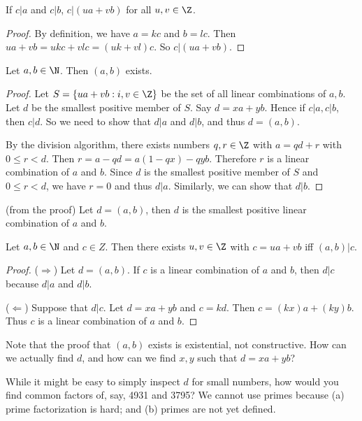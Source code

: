 \documentclass[a4paper]{article}
\begin{document}
\begin{prop}
  If $c|a$ and $c|b$, $c|(ua + vb)$ for all $u, v\in \Z$.
\end{prop}

\begin{proof}
  By definition, we have $a = kc$ and $b = lc$. Then $ua + vb = ukc + vlc = (uk + vl)c$. So $c|(ua + vb)$.
\end{proof}

\begin{thm}
  Let $a,b\in \N$. Then $(a, b)$ exists.
\end{thm}

\begin{proof}
  Let $S=\{ua + vb:i, v\in\Z\}$ be the set of all linear combinations of $a, b$. Let $d$ be the smallest positive member of $S$. Say $d = xa + yb$. Hence if $c|a, c|b$, then $c|d$. So we need to show that $d|a$ and $d|b$, and thus $d=(a, b)$.

  By the division algorithm, there exists numbers $q, r\in\Z$ with $a = qd + r$ with $0\leq r < d$. Then $r = a - qd = a(1 - qx) - qyb$. Therefore $r$ is a linear combination of $a$ and $b$. Since $d$ is the smallest positive member of $S$ and $0\leq r < d$, we have $r = 0$ and thus $d|a$. Similarly, we can show that $d|b$.
\end{proof}

\begin{cor}
  (from the proof) Let $d  = (a, b)$, then $d$ is the smallest positive linear combination of $a$ and $b$.
\end{cor}

\begin{cor}
  Let $a, b\in\N$ and $c\in Z$. Then there exists $u, v\in \Z$  with $c=ua + vb$ iff $(a, b)|c$.
\end{cor}

\begin{proof}
  ($\Rightarrow$) Let $d=(a, b)$. If $c$ is a linear combination of $a$ and $b$, then $d|c$ because $d|a$ and $d|b$.

  ($\Leftarrow$) Suppose that $d|c$. Let $d = xa + yb$ and $c = kd$. Then $c = (kx)a + (ky)b$. Thus $c$ is a linear combination of $a$ and $b$.
\end{proof}

Note that the proof that $(a, b)$ exists is existential, not constructive. How can we actually find $d$, and how can we find $x, y$ such that $d = xa + yb$?

While it might be easy to simply inspect $d$ for small numbers, how would you find common factors of, say, 4931 and 3795? We cannot use primes because (a) prime factorization is hard; and (b) primes are not yet defined.
\end{document}
